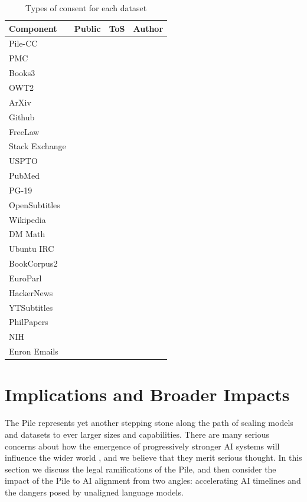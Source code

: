 \documentclass[11pt,a4paper]{article}
\newcommand{\cmark}{\ding{51}}
\begin{document}
\begin{table}
    \centering
    \begin{tabularx}{\columnwidth}{l|c c c}
        \hline
        \textbf{Component} & \textbf{Public} & \textbf{ToS} & \textbf{Author} \\
        \midrule
        Pile-CC & \cmark & \cmark & \\
        PMC & \cmark & \cmark & \cmark\\
        Books3 & \cmark & & \\
        OWT2 & \cmark & & \\
        ArXiv & \cmark & \cmark & \cmark\\
        Github & \cmark & \cmark & \\
        FreeLaw & \cmark & \cmark & \cmark\\
        Stack Exchange & \cmark & \cmark & \cmark\\
        USPTO & \cmark & \cmark & \cmark\\
        PubMed & \cmark & \cmark & \cmark\\
        PG-19 & \cmark & \cmark & \\
        OpenSubtitles & \cmark & & \\
        Wikipedia & \cmark & \cmark & \cmark\\
        DM Math & \cmark & \cmark & \cmark\\
        Ubuntu IRC & \cmark & \cmark & \cmark\\
        BookCorpus2 & \cmark & & \\
        EuroParl & \cmark & \cmark & \cmark\\
        HackerNews & \cmark & \cmark & \\
        YTSubtitles & \cmark & & \\
        PhilPapers & \cmark & \cmark & \cmark\\
        NIH & \cmark & \cmark & \cmark\\
        Enron Emails & \cmark & \cmark & \\
        \hline
    \end{tabularx}
    \caption{Types of consent for each dataset}
    \label{table:consent}
\end{table}

\section{Implications and Broader Impacts}

The Pile represents yet another stepping stone along the path of scaling models and datasets to ever larger sizes and capabilities. There are many serious concerns about how the emergence of progressively stronger AI systems will influence the wider world \citep{brundage_malicious_2018,amodei_concrete_2016,bostrom2014ethics,bostrom2014superintelligence,critch2020ai}, and we believe that they merit serious thought. In this section we discuss the legal ramifications of the Pile, and then consider the impact of the Pile to AI alignment from two angles: accelerating AI timelines and the dangers posed by unaligned language models.
\end{document}
